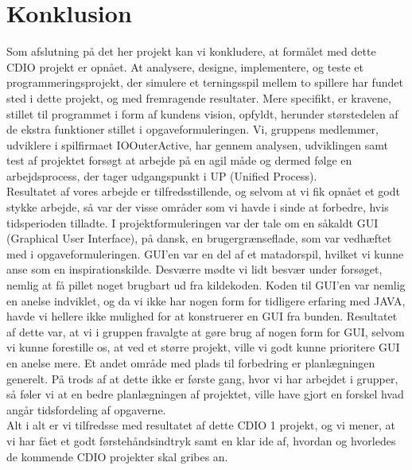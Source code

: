 \chapter{Konklusion}
Som afslutning på det her projekt kan vi konkludere, at formålet med dette CDIO projekt er opnået. At analysere, designe, implementere, og teste et programmeringsprojekt, der simulere et terningsspil mellem to spillere har fundet sted i dette projekt, og med fremragende resultater. Mere specifikt, er kravene, stillet til programmet i form af kundens vision, opfyldt, herunder størstedelen af de ekstra funktioner stillet i opgaveformuleringen. Vi, gruppens medlemmer, udviklere i spilfirmaet IOOuterActive, har gennem analysen, udviklingen samt test af projektet forsøgt at arbejde på en agil måde og dermed følge en arbejdsprocess, der tager udgangspunkt i UP (Unified Process). \\

Resultatet af vores arbejde er tilfredsstillende, og selvom at vi fik opnået et godt stykke arbejde, så var der visse områder som vi havde i sinde at forbedre, hvis tidsperioden tilladte. I projektformuleringen var der tale om en såkaldt GUI (Graphical User Interface), på dansk, en brugergrænseflade, som var vedhæftet med i opgaveformuleringen. GUI’en var en del af et matadorspil, hvilket vi kunne anse som en inspirationskilde. Desværre mødte vi lidt besvær under forsøget, nemlig at få pillet noget brugbart ud fra kildekoden. Koden til GUI’en var nemlig en anelse indviklet, og da vi ikke har nogen form for tidligere erfaring med JAVA, havde vi hellere ikke mulighed for at konstruerer en GUI fra bunden. Resultatet af dette var, at vi i gruppen fravalgte at gøre brug af nogen form for GUI, selvom vi kunne forestille os, at ved et større projekt, ville vi godt kunne prioritere GUI en anelse mere. Et andet område med plads til forbedring er planlægningen generelt. På trods af at dette ikke er første gang, hvor vi har arbejdet i grupper, så føler vi at en bedre planlægningen af projektet, ville have gjort en forskel hvad angår tidsfordeling af opgaverne. \\

Alt i alt er vi tilfredsse med resultatet af dette CDIO 1 projekt, og vi mener, at vi har fået et godt førstehåndsindtryk samt en klar ide af, hvordan og hvorledes de kommende CDIO projekter skal gribes an.